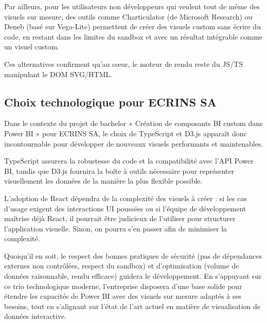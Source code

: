 Par ailleurs, pour les utilisateurs non développeurs qui veulent tout de même des visuels sur mesure, des outils comme Charticulator (de Microsoft Research) ou Deneb (basé sur Vega-Lite) permettent de créer des visuels custom sans écrire du code, en restant dans les limites du sandbox et avec un résultat intégrable comme un visuel custom.

Ces alternatives confirment qu’au cœur, le moteur de rendu reste du JS/TS manipulant le DOM SVG/HTML.

\subsection{Choix technologique pour ECRINS SA}

Dans le contexte du projet de bachelor « Création de composants BI custom dans Power BI » pour ECRINS SA, le choix de TypeScript et D3.js apparaît donc incontournable pour développer de nouveaux visuels performants et maintenables.

TypeScript assurera la robustesse du code et la compatibilité avec l’API Power BI, tandis que D3.js fournira la boîte à outils nécessaire pour représenter visuellement les données de la manière la plus flexible possible.

L’adoption de React dépendra de la complexité des visuels à créer : si les cas d’usage exigent des interactions UI poussées ou si l’équipe de développement maîtrise déjà React, il pourrait être judicieux de l’utiliser pour structurer l’application visuelle. Sinon, on pourra s’en passer afin de minimiser la complexité.

Quoiqu’il en soit, le respect des bonnes pratiques de sécurité (pas de dépendances externes non contrôlées, respect du sandbox) et d’optimisation (volume de données raisonnable, rendu efficace) guidera le développement. En s’appuyant sur ce trio technologique moderne, l’entreprise disposera d’une base solide pour étendre les capacités de Power BI avec des visuels sur mesure adaptés à ses besoins, tout en s’alignant sur l’état de l’art actuel en matière de visualisation de données interactive.
